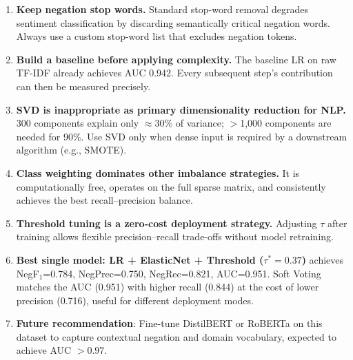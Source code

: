 \documentclass[11pt,a4paper]{article}
\begin{document}
\begin{enumerate}[leftmargin=2em]
  \item \textbf{Keep negation stop words.}
        Standard stop-word removal degrades sentiment classification
        by discarding semantically critical negation words.
        Always use a custom stop-word list that excludes negation tokens.

  \item \textbf{Build a baseline before applying complexity.}
        The baseline LR on raw TF-IDF already achieves AUC 0.942.
        Every subsequent step's contribution can then be measured precisely.

  \item \textbf{SVD is inappropriate as primary dimensionality reduction
        for NLP.}
        300 components explain only $\approx$30\% of variance;
        $>$1,000 components are needed for 90\%. Use SVD only when
        dense input is required by a downstream algorithm (e.g., SMOTE).

  \item \textbf{Class weighting dominates other imbalance strategies.}
        It is computationally free, operates on the full sparse matrix,
        and consistently achieves the best recall--precision balance.

  \item \textbf{Threshold tuning is a zero-cost deployment strategy.}
        Adjusting $\tau$ after training allows flexible precision--recall
        trade-offs without model retraining.

  \item \textbf{Best single model: LR + ElasticNet + Threshold ($\tau^*=0.37$)}
        achieves NegF$_1$=0.784, NegPrec=0.750, NegRec=0.821, AUC=0.951.
        Soft Voting matches the AUC (0.951) with higher recall (0.844)
        at the cost of lower precision (0.716), useful for different deployment modes.

  \item \textbf{Future recommendation}: Fine-tune DistilBERT or RoBERTa
        on this dataset to capture contextual negation and domain vocabulary,
        expected to achieve AUC $>0.97$.
\end{enumerate}
\end{document}
